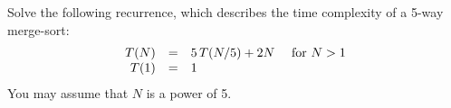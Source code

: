 Solve the following recurrence, which describes the time complexity of
a 5-way merge-sort:
\[
\begin{array}{r c l }
T(N) & = & 5\,T(N/5)+2N  ~~~~ \mbox{for $N > 1$}\\
T(1) & = & 1
\end{array}
\]
You may assume that $N$ is a power of 5.
